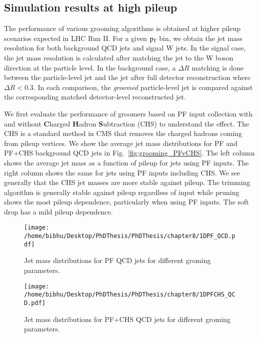 \subsection{Simulation results at high pileup}


The performance of various grooming algorithms is obtained at higher pileup scenarios expected in LHC Run II.
For a given $\rm p_{T}$ bin, we obtain the jet mass resolution for both background QCD jets and signal W jets.  
In the signal case, the jet mass resolution is calculated after matching the jet to the W boson direction at the particle level.  
In the background case, a $\Delta R$ matching is done between the particle-level jet and the jet after full detector reconstruction where $\Delta R < 0.3$. In each comparison, the {\it groomed} particle-level jet is compared against the corresponding matched detector-level reconstructed jet.

We first evaluate the performance of groomers based on PF input collection with and without {\bf C}harged {\bf H}adron {\bf S}ubtraction (CHS) to understand the effect. The CHS is a standard method in CMS that removes the charged hadrons coming from pileup vertices.
We show the average jet mass distributions for PF and PF+CHS background QCD jets in Fig.~\ref{fig:grooming_PFvCHS}.
The left column shows the average jet mass as a function of pileup for jets using PF inputs.
The right column shows the same for jets using PF inputs including CHS. We see generally that the CHS jet masses are more stable against pileup. The trimming algorithm is generally stable against pileup regardless of input while pruning shows the most pileup dependence, particularly when using PF inputs. The soft drop has a mild pileup dependence.


\begin{figure}[h!]
\centering
\texttt{[image: /home/bibhu/Desktop/PhDThesis/PhDThesis/chapter8/1DPF\_QCD.pdf]}
\caption{Jet mass distributions for PF  QCD jets for different groming parameters.}
\label{fig:jet_mass_pf_all_groomer}
\end{figure}


\begin{figure}[h]
\centering
\texttt{[image: /home/bibhu/Desktop/PhDThesis/PhDThesis/chapter8/1DPFCHS\_QCD.pdf]}
\caption{Jet mass distributions for PF+CHS  QCD jets for different groming parameters.}
\label{fig:jet_mass_chs_all_groomer}
\end{figure}



